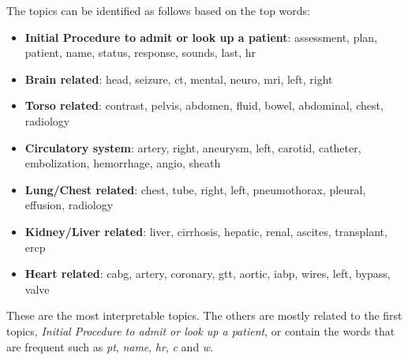 \documentclass[]{article}
\begin{document}
The topics can be identified as follows based on the top words:
\begin{itemize}
	\item \textbf{Initial Procedure to admit or look up a patient}: assessment, plan, patient, name, status, response, sounds, last, hr
	
	\item \textbf{Brain related}: head, seizure, ct, mental, neuro, mri, left, right 
	
	\item \textbf{Torso related}: contrast, pelvis, abdomen, fluid, bowel, abdominal, chest, radiology
	
	\item \textbf{Circulatory system}: artery, right, aneurysm, left, carotid, catheter, embolization, hemorrhage, angio, sheath
	
	\item \textbf{Lung/Chest related}: chest, tube, right, left, pneumothorax, pleural, effusion, radiology
	
	\item \textbf{Kidney/Liver related}: liver, cirrhosis, hepatic, renal, ascites, transplant, ercp
	
	\item \textbf{Heart related}: cabg, artery, coronary, gtt, aortic, iabp, wires, left, bypass, valve
\end{itemize}

These are the most interpretable topics. The others are mostly related to the first topics, \textit{Initial Procedure to admit or look up a patient}, or contain the words that are frequent such as \textit{pt}, \textit{name}, \textit{hr}, \textit{c} and \textit{w}.
\end{document}
